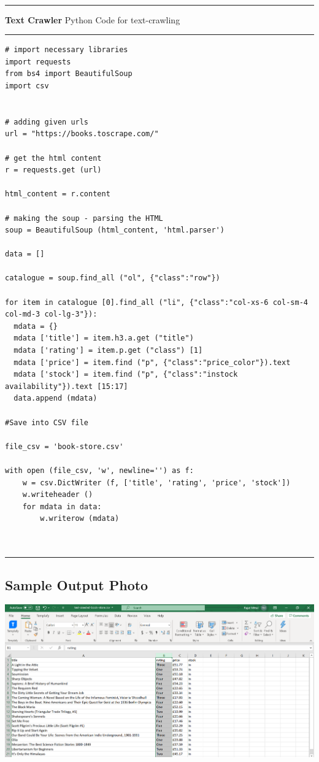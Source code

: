 \documentclass[11pt]{article}
\begin{document}
 \\
\rule{\textwidth}{0.4pt}
\textbf{Text Crawler} Python Code for text-crawling\\
\rule{\textwidth}{0.4pt}
\begin{lstlisting}
# import necessary libraries
import requests
from bs4 import BeautifulSoup
import csv


# adding given urls
url = "https://books.toscrape.com/"

# get the html content
r = requests.get (url)

html_content = r.content

# making the soup - parsing the HTML
soup = BeautifulSoup (html_content, 'html.parser')

data = []

catalogue = soup.find_all ("ol", {"class":"row"})

for item in catalogue [0].find_all ("li", {"class":"col-xs-6 col-sm-4 col-md-3 col-lg-3"}):
  mdata = {}
  mdata ['title'] = item.h3.a.get ("title")
  mdata ['rating'] = item.p.get ("class") [1]
  mdata ['price'] = item.find ("p", {"class":"price_color"}).text
  mdata ['stock'] = item.find ("p", {"class":"instock availability"}).text [15:17]
  data.append (mdata)

#Save into CSV file

file_csv = 'book-store.csv'

with open (file_csv, 'w', newline='') as f:
    w = csv.DictWriter (f, ['title', 'rating', 'price', 'stock'])
    w.writeheader ()
    for mdata in data:
        w.writerow (mdata)



\end{lstlisting}
\rule{\textwidth}{0.4pt}

\subsection*{Sample Output Photo}
\includegraphics[scale=0.5]{images/Text-crawled.PNG}
\end{document}
